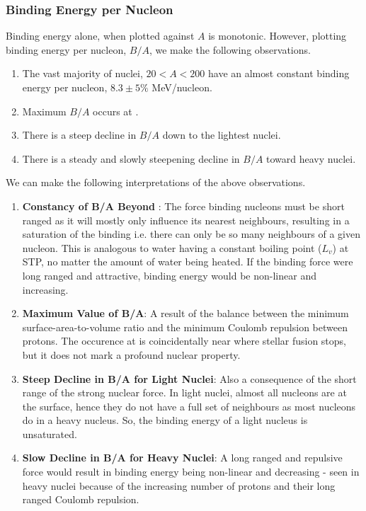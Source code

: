\subsubsection*{Binding Energy per Nucleon}
Binding energy alone, when plotted against \(A\) is monotonic. However, plotting binding energy per nucleon, \(B/A\), we make the following observations. 
\begin{enumerate}
    \item The vast majority of nuclei, \(20 < A < 200\) have an almost constant binding energy per nucleon, \(8.3 \pm 5\%\) MeV/nucleon.
    \item Maximum \(B/A\) occurs at .
    \item There is a steep decline in \(B/A\) down to the lightest nuclei.
    \item There is a steady and slowly steepening decline in \(B/A\) toward heavy nuclei.
\end{enumerate}
We can make the following interpretations of the above observations.
\begin{enumerate}
    \item \textbf{Constancy of B/A Beyond }: The force binding nucleons must be short ranged as it will mostly only influence its nearest neighbours, resulting in a saturation of the binding i.e. there can only be so many neighbours of a given nucleon. This is analogous to water having a constant boiling point (\(L_v\)) at STP, no matter the amount of water being heated. If the binding force were long ranged and attractive, binding energy would be non-linear and increasing. 
    \item \textbf{Maximum Value of B/A}: A result of the balance between the minimum surface-area-to-volume ratio and the minimum Coulomb repulsion between protons. The occurence at  is coincidentally near where stellar fusion stops, but it does not mark a profound nuclear property. 
    \item \textbf{Steep Decline in B/A for Light Nuclei}: Also a consequence of the short range of the strong nuclear force. In light nuclei, almost all nucleons are at the surface, hence they do not have a full set of neighbours as most nucleons do in a heavy nucleus. So, the binding energy of a light nucleus is unsaturated.
    \item \textbf{Slow Decline in B/A for Heavy Nuclei}: A long ranged and repulsive force would result in binding energy being non-linear and decreasing - seen in heavy nuclei because of the increasing number of protons and their long ranged Coulomb repulsion.
\end{enumerate}

